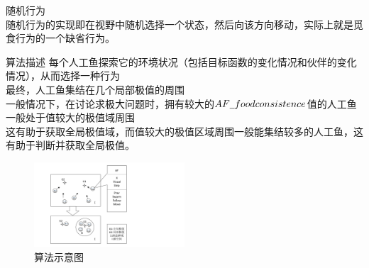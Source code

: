 \documentclass[a4paper, 11pt]{article}
\begin{document}
\begin{section}
\begin{subsection}
		\small{随机行为}\vspace{3ex}\\
		\vspace{6ex}随机行为的实现即在视野中随机选择一个状态，然后向该方向移动，实际上就是觅食行为的一个缺省行为。
	\end{subsection}
	\begin{subsection}{算法描述}
	每个人工鱼探索它的环境状况（包括目标函数的变化情况和伙伴的变化情况），从而选择一种行为\\最终，人工鱼集结在几个局部极值的周围\\一般情况下，在讨论求极大问题时，拥有较大的$AF\underline{\hspace{0.5em}}foodconsistence$值的人工鱼一般处于值较大的极值域周围\\这有助于获取全局极值域，而值较大的极值区域周围一般能集结较多的人工鱼，这有助于判断并获取全局极值。
		\begin{figure}[htbp]
			\centering
			\includegraphics[width=0.5\textwidth]{../pic/fish3.pdf}
			\caption{算法示意图}
		\end{figure}
	\end{subsection}
\end{section}
\end{document}
